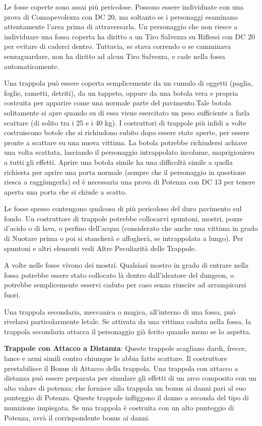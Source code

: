 \documentclass[a4paper,11pt,twoside,openany]{book}
\begin{document}
{Le fosse coperte sono assai più pericolose. Possono essere individuate con una prova di Consapevolezza con DC 20, ma soltanto se i personaggi esaminano attentamente l'area prima di attraversarla. Un personaggio che non riesce a individuare una fossa coperta ha diritto a un Tiro Salvezza su Riflessi con DC 20 per evitare di caderci dentro. Tuttavia, se stava correndo o se camminava senzaguardare, non ha diritto ad alcun Tiro Salvezza, e cade nella fossa automaticamente.

Una trappola può essere coperta semplicemente da un cumulo di oggetti (paglia, foglie, rametti, detriti), da un tappeto, oppure da una botola vera e propria costruita per apparire come una normale parte del pavimento.Tale botola solitamente si apre quando su di essa viene esercitato un peso sufficiente a farla scattare (di solito tra i 25 e i 40 kg). I costruttori di trappole più infidi a volte costruiscono botole che si richiudono subito dopo essere state aperte, per essere pronte a scattare su una nuova vittima. La botola potrebbe richiudersi achiave una volta scattata, lasciando il personaggio intrappolato incolume, maprigioniero a tutti gli effetti. Aprire una botola simile ha una difficoltà simile a quella richiesta per aprire una porta normale (sempre che il personaggio in questione riesca a raggiungerla) ed è necessaria una prova di Potenza con DC 13 per tenere aperta una porta che si chiude a scatto.

Le fosse spesso contengono qualcosa di più pericoloso del duro pavimento sul fondo. Un costruttore di trappole potrebbe collocarvi spuntoni, mostri, pozze d'acido o di lava, o perfino dell'acqua (considerato che anche una vittima in grado di Nuotare prima o poi si stancherà e affogherà, se intrappolata a lungo). Per spuntoni e altri elementi vedi Altre Peculiarità delle Trappole.

A volte nelle fosse vivono dei mostri. Qualsiasi mostro in grado di entrare nella fossa potrebbe essere stato collocato là dentro dall'ideatore del dungeon, o potrebbe semplicemente esservi caduto per caso senza riuscire ad arrampicarsi fuori.

Una trappola secondaria, meccanica o magica, all'interno di una fossa, può rivelarsi particolarmente letale. Se attivata da una vittima caduta nella fossa, la trappola secondaria attacca il personaggio già ferito quando meno se lo aspetta.

\textbf{Trappole con Attacco a Distanza}: Queste trappole scagliano dardi, frecce, lance e armi simili contro chiunque le abbia fatte scattare. Il costruttore prestabilisce il Bonus di Attacco della trappola. Una trappola con attacco a distanza può essere preparata per simulare gli effetti di un arco composito con un alto valore di potenza; che fornisce alla trappola un bonus ai danni pari al suo punteggio di Potenza. Queste trappole infliggono il danno a seconda del tipo di munizione impiegata. Se una trappola è costruita con un alto punteggio di Potenza, avrà il corrispondente bonus ai danni.

}
\end{document}
